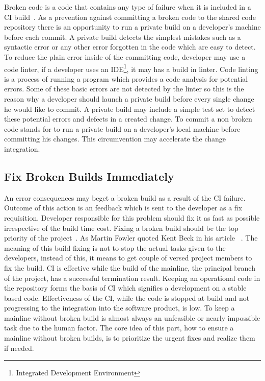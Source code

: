 Broken code is a code that contains any type of failure when it is included in a CI build~\cite{CIQualityFramework}. As a prevention against committing a broken code to the shared code repository there is an opportunity to run a private build on a developer's machine before each commit. A private build detects the simplest mistakes such as a syntactic error or any other error forgotten in the code which are easy to detect. To reduce the plain error inside of the committing code, developer may use a code linter, if a developer uses an IDE\footnote{Integrated Development Environment}, it may has a build in linter. Code linting is a process of running a program which provides a code analysis for potential errors. Some of these basic errors are not detected by the linter so this is the reason why a developer should launch a private build before every single change he would like to commit. A private build may include a simple test set to detect these potential errors and defects in a created change. To commit a non broken code stands for to run a private build on a developer's local machine before committing his changes. This circumvention may accelerate the change integration.

\subsection{Fix Broken Builds Immediately}

An error consequences may beget a broken build as a result of the CI failure. Outcome of this action is an feedback which is sent to the developer as a fix requisition. Developer responsible for this problem should fix it as fast as possible irrespective of the build time cost. Fixing a broken build should be the top priority of the project~\cite{CIQualityFramework}. As Martin Fowler quoted Kent Beck in his article ~\cite{MartinFowler}. The meaning of this build fixing is not to stop the actual tasks given to the developers, instead of this, it means to get couple of versed project members to fix the build. CI is effective while the build of the mainline, the principal branch of the project, has a successful termination result. Keeping an operational code in the repository forms the basis of CI which signifies a development on a stable based code. Effectiveness of the CI, while the code is stopped at build and not progressing to the integration into the software product, is low. To keep a mainline without broken build is almost always an unfeasible or nearly impossible task due to the human factor. The core idea of this part, how to ensure a mainline without broken builds, is to prioritize the urgent fixes and realize them if needed.\\


